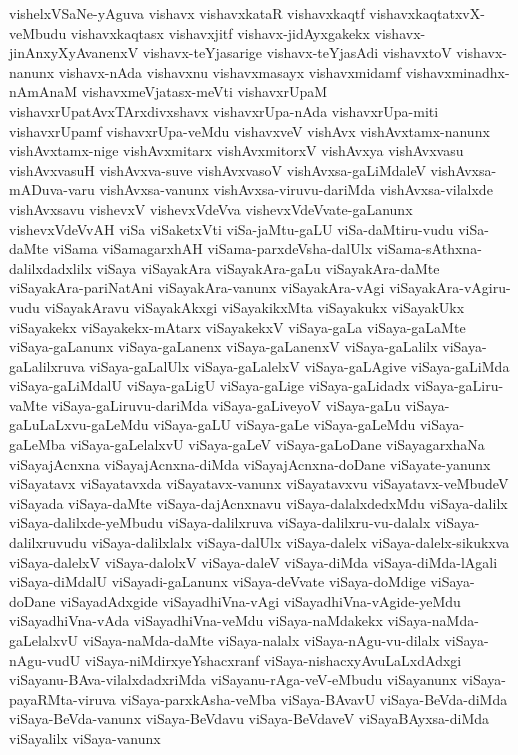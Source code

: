 {vishelxVSaNe-yAguva
vishavx
vishavxkataR
vishavxkaqtf
vishavxkaqtatxvX-veMbudu
vishavxkaqtasx
vishavxjitf
vishavx-jidAyxgakekx
vishavx-jinAnxyXyAvanenxV
vishavx-teYjasarige
vishavx-teYjasAdi
vishavxtoV
vishavx-nanunx
vishavx-nAda
vishavxnu
vishavxmasayx
vishavxmidamf
vishavxminadhx-nAmAnaM
vishavxmeVjatasx-meVti
vishavxrUpaM
vishavxrUpatAvxTArxdivxshavx
vishavxrUpa-nAda
vishavxrUpa-miti
vishavxrUpamf
vishavxrUpa-veMdu
vishavxveV
vishAvx
vishAvxtamx-nanunx
vishAvxtamx-nige
vishAvxmitarx
vishAvxmitorxV
vishAvxya
vishAvxvasu
vishAvxvasuH
vishAvxva-suve
vishAvxvasoV
vishAvxsa-gaLiMdaleV
vishAvxsa-mADuva-varu
vishAvxsa-vanunx
vishAvxsa-viruvu-dariMda
vishAvxsa-vilalxde
vishAvxsavu
vishevxV
vishevxVdeVva
vishevxVdeVvate-gaLanunx
vishevxVdeVvAH
viSa
viSaketxVti
viSa-jaMtu-gaLU
viSa-daMtiru-vudu
viSa-daMte
viSama
viSamagarxhAH
viSama-parxdeVsha-dalUlx
viSama-sAthxna-dalilxdadxlilx
viSaya
viSayakAra
viSayakAra-gaLu
viSayakAra-daMte
viSayakAra-pariNatAni
viSayakAra-vanunx
viSayakAra-vAgi
viSayakAra-vAgiru-vudu
viSayakAravu
viSayakAkxgi
viSayakikxMta
viSayakukx
viSayakUkx
viSayakekx
viSayakekx-mAtarx
viSayakekxV
viSaya-gaLa
viSaya-gaLaMte
viSaya-gaLanunx
viSaya-gaLanenx
viSaya-gaLanenxV
viSaya-gaLalilx
viSaya-gaLalilxruva
viSaya-gaLalUlx
viSaya-gaLalelxV
viSaya-gaLAgive
viSaya-gaLiMda
viSaya-gaLiMdalU
viSaya-gaLigU
viSaya-gaLige
viSaya-gaLidadx
viSaya-gaLiru-vaMte
viSaya-gaLiruvu-dariMda
viSaya-gaLiveyoV
viSaya-gaLu
viSaya-gaLuLaLxvu-gaLeMdu
viSaya-gaLU
viSaya-gaLe
viSaya-gaLeMdu
viSaya-gaLeMba
viSaya-gaLelalxvU
viSaya-gaLeV
viSaya-gaLoDane
viSayagarxhaNa
viSayajAcnxna
viSayajAcnxna-diMda
viSayajAcnxna-doDane
viSayate-yanunx
viSayatavx
viSayatavxda
viSayatavx-vanunx
viSayatavxvu
viSayatavx-veMbudeV
viSayada
viSaya-daMte
viSaya-dajAcnxnavu
viSaya-dalalxdedxMdu
viSaya-dalilx
viSaya-dalilxde-yeMbudu
viSaya-dalilxruva
viSaya-dalilxru-vu-dalalx
viSaya-dalilxruvudu
viSaya-dalilxlalx
viSaya-dalUlx
viSaya-dalelx
viSaya-dalelx-sikukxva
viSaya-dalelxV
viSaya-dalolxV
viSaya-daleV
viSaya-diMda
viSaya-diMda-lAgali
viSaya-diMdalU
viSayadi-gaLanunx
viSaya-deVvate
viSaya-doMdige
viSaya-doDane
viSayadAdxgide
viSayadhiVna-vAgi
viSayadhiVna-vAgide-yeMdu
viSayadhiVna-vAda
viSayadhiVna-veMdu
viSaya-naMdakekx
viSaya-naMda-gaLelalxvU
viSaya-naMda-daMte
viSaya-nalalx
viSaya-nAgu-vu-dilalx
viSaya-nAgu-vudU
viSaya-niMdirxyeYshacxranf
viSaya-nishacxyAvuLaLxdAdxgi
viSayanu-BAva-vilalxdadxriMda
viSayanu-rAga-veV-eMbudu
viSayanunx
viSaya-payaRMta-viruva
viSaya-parxkAsha-veMba
viSaya-BAvavU
viSaya-BeVda-diMda
viSaya-BeVda-vanunx
viSaya-BeVdavu
viSaya-BeVdaveV
viSayaBAyxsa-diMda
viSayalilx
viSaya-vanunx
}
